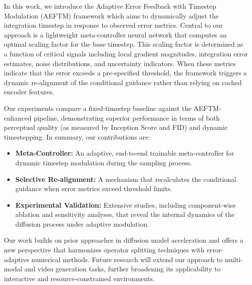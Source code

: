\documentclass{article} %
\begin{document}
In this work, we introduce the Adaptive Error Feedback with Timestep Modulation (AEFTM) framework which aims to dynamically adjust the integration timestep in response to observed error metrics. Central to our approach is a lightweight meta‐controller neural network that computes an optimal scaling factor for the base timestep. This scaling factor is determined as a function of critical signals including local gradient magnitudes, integration error estimates, noise distributions, and uncertainty indicators. When these metrics indicate that the error exceeds a pre‐specified threshold, the framework triggers a dynamic re‐alignment of the conditional guidance rather than relying on cached encoder features.

Our experiments compare a fixed‐timestep baseline against the AEFTM‐enhanced pipeline, demonstrating superior performance in terms of both perceptual quality (as measured by Inception Score and FID) and dynamic timestepping. In summary, our contributions are:
\begin{itemize}
  \item \textbf{Meta‐Controller:} An adaptive, end-to-end trainable meta-controller for dynamic timestep modulation during the sampling process.
  \item \textbf{Selective Re-alignment:} A mechanism that recalculates the conditional guidance when error metrics exceed threshold limits.
  \item \textbf{Experimental Validation:} Extensive studies, including component-wise ablation and sensitivity analyses, that reveal the internal dynamics of the diffusion process under adaptive modulation.
\end{itemize}
Our work builds on prior approaches in diffusion model acceleration \cite{salimans2024multistep, wizadwongsa2023accelerating} and offers a new perspective that harmonizes operator splitting techniques with error-adaptive numerical methods. Future research will extend our approach to multi-modal and video generation tasks, further broadening its applicability to interactive and resource-constrained environments.
\end{document}
